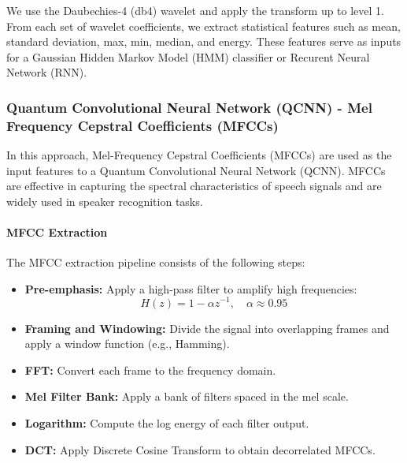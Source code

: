 \documentclass[conference]{IEEEtran}
\begin{document}
We use the Daubechies-4 (db4) wavelet and apply the transform up to level 1.
From each set of wavelet coefficients, we extract statistical features such as mean, standard deviation, max, min, median, and energy. These features serve as inputs for a Gaussian Hidden Markov Model (HMM) classifier or Recurent Neural Network (RNN). \cite{tufekci2000dwt}














\subsubsection{Quantum Convolutional Neural Network (QCNN) - Mel Frequency Cepstral
    Coefficients (MFCCs)}

In this approach, Mel-Frequency Cepstral Coefficients (MFCCs) are used as the input
features to a Quantum Convolutional Neural Network (QCNN). MFCCs are effective in
capturing the spectral characteristics of speech signals and are widely used in
speaker recognition tasks.

\paragraph{MFCC Extraction}

The MFCC extraction pipeline consists of the following steps:

\begin{itemize}
    \item \textbf{Pre-emphasis:} Apply a high-pass filter to amplify high frequencies:
          \[
              H(z) = 1 - \alpha z^{-1}, \quad \alpha \approx 0.95
          \]
    \item \textbf{Framing and Windowing:} Divide the signal into overlapping frames
          and apply a window function (e.g., Hamming).
    \item \textbf{FFT:} Convert each frame to the frequency domain.
    \item \textbf{Mel Filter Bank:} Apply a bank of filters spaced in the mel scale.
    \item \textbf{Logarithm:} Compute the log energy of each filter output.
    \item \textbf{DCT:} Apply Discrete Cosine Transform to obtain decorrelated MFCCs.
\end{itemize}
\end{document}

